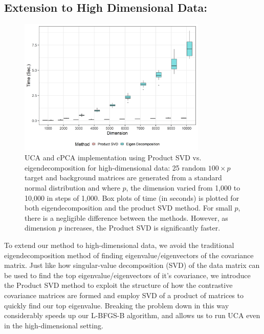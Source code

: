\documentclass[12pt]{article}
\begin{document}
\subsection{Extension to High Dimensional Data:}
\begin{figure}[!ht]
  \label{fig:computational_perf}
  \centering
  \includegraphics[width = 0.8\textwidth]{figure/final_perf.png}
  \caption{UCA and cPCA implementation using Product SVD vs. eigendecomposition for high-dimensional data: 25 random $100 \times p $ target and background matrices are generated from a standard normal distribution and where $p$, the dimension varied from 1,000 to 10,000 in steps of 1,000. Box plots of time (in seconds) is plotted for both eigendecomposition and the product SVD method. For small $p$, there is a negligible difference between the methods. However, as dimension $p$ increases, the Product SVD is significantly faster.}
\end{figure}

To extend our method to high-dimensional data, we avoid the traditional eigendecomposition method of finding eigenvalue/eigenvectors of the covariance matrix. Just like how singular-value decomposition (SVD) of the data matrix can be used to find the top eigenvalue/eigenvectors of it's covariance, we introduce the Product SVD method to exploit the structure of how the contrastive covariance matrices are formed and employ SVD of a product of matrices to quickly find our top eigenvalue.  Breaking the problem down in this way considerably speeds up our L-BFGS-B algorithm, and allows us to run UCA even in the high-dimensional setting.
\end{document}
